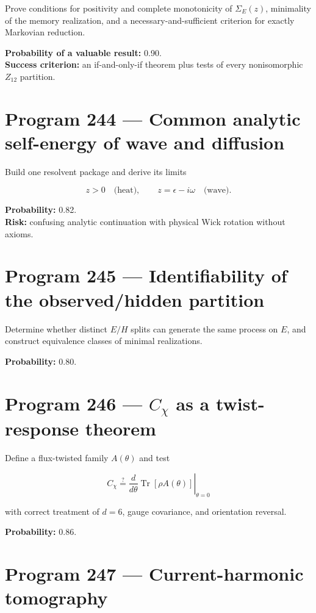 \documentclass[11pt,a4paper,openany]{report}
\begin{document}
Prove conditions for positivity and complete monotonicity of \(\Sigma_E(z)\), minimality of the memory realization, and a necessary-and-sufficient criterion for exactly Markovian reduction.

\textbf{Probability of a valuable result:} 0.90.\\
\textbf{Success criterion:} an if-and-only-if theorem plus tests of every nonisomorphic \(Z_{12}\) partition.

\section{Program 244 --- Common analytic self-energy of wave and diffusion}

Build one resolvent package and derive its limits

\[
z>0\quad\text{(heat)},\qquad z=\epsilon-i\omega\quad\text{(wave)}.
\]

\textbf{Probability:} 0.82.\\
\textbf{Risk:} confusing analytic continuation with physical Wick rotation without axioms.

\section{Program 245 --- Identifiability of the observed/\allowbreak{}hidden partition}

Determine whether distinct \(E/H\) splits can generate the same process on \(E\), and construct equivalence classes of minimal realizations.

\textbf{Probability:} 0.80.

\section{\texorpdfstring{Program 246 --- \(C_\chi\) as a twist-response theorem}{Program 246 --- C\_ as a twist-response theorem}}

Define a flux-twisted family \(A(\theta)\) and test

\[
C_\chi\stackrel{?}{=}
\left.\frac{d}{d\theta}
\operatorname{Tr}[\rho A(\theta)]
\right|_{\theta=0}
\]

with correct treatment of \(d=6\), gauge covariance, and orientation reversal.

\textbf{Probability:} 0.86.

\section{Program 247 --- Current-harmonic tomography}
\end{document}

